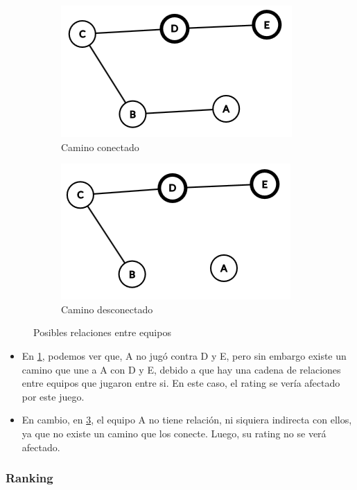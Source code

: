 \documentclass[a4paper]{article}
\begin{document}
\begin{figure}[H]
    \begin{subfigure}{.5\textwidth}
        \centering
        \includegraphics[scale=0.5]{img/grafos/CaminoConectado.png}
        \caption{Camino conectado}
        \label{camino-conectado}
    \end{subfigure}
    \begin{subfigure}{.5\textwidth}
        \centering
        \includegraphics[scale=0.5]{img/grafos/CaminoNoConectado.png}
        \caption{Camino desconectado}
        \label{camino-desconectado}
    \end{subfigure}
    \caption{Posibles relaciones entre equipos}
\end{figure}

\begin{itemize}
    \item En \ref{camino-conectado}, podemos ver que, A no jugó contra D y E, pero sin embargo existe un camino que une a A con D y E, debido a que hay una cadena de relaciones entre equipos que jugaron entre si. En este caso, el rating se vería afectado por este juego. 
    \item En cambio, en \ref{camino-desconectado}, el equipo A no tiene relación, ni siquiera indirecta con ellos, ya que no existe un camino que los conecte. Luego, su rating no se verá afectado.
\end{itemize}
\subsubsection{Ranking}
\end{document}
